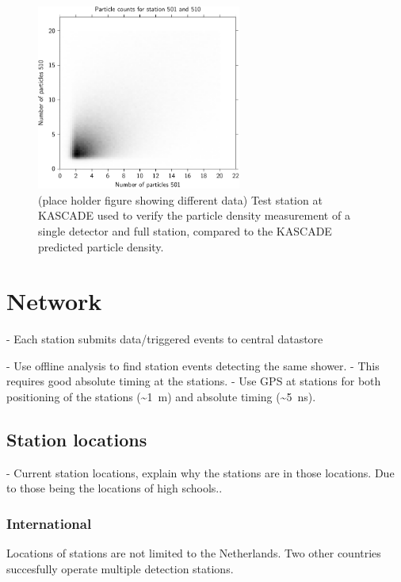 \begin{figure}
    \centering
    \includegraphics[width=0.6\textwidth]
                    {plots/experiment/n_501_510_sum}
    \caption{(place holder figure showing different data) Test station at KASCADE used to verify the particle density measurement of a single detector and full station, compared to the KASCADE predicted particle density.}
    \label{fig:n_501_510_sum}
\end{figure}



\section{Network}


- Each station submits data/triggered events to central datastore

- Use offline analysis to find station events detecting the same shower.
    - This requires good absolute timing at the stations.
    - Use GPS at stations for both positioning of the stations (\SI{~1}{\meter}) and absolute timing (\SI{~5}{\ns}).

\subsection{Station locations}

- Current station locations, explain why the stations are in those locations. Due to those being the locations of high schools..


\subsubsection{International}

Locations of \hisparc stations are not limited to the Netherlands. Two other countries succesfully operate multiple detection stations.

